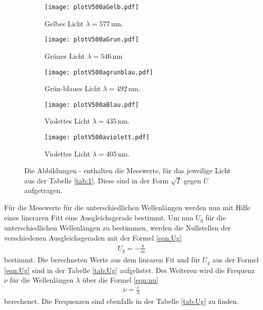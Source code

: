 \begin{figure}
\centering
\begin{subfigure}{0.48\textwidth}
\centering
\texttt{[image: plotV500aGelb.pdf]}
\caption{Gelbes Licht $\lambda=577\,\si{\nano\meter}$.}
\label{fig:ge}
\end{subfigure}
\begin{subfigure}{0.48\textwidth}
\centering
\texttt{[image: plotV500aGrun.pdf]}
\caption{Grünes Licht $\lambda=546\,\si{\nano\meter}$.}
\label{fig:gr}
\end{subfigure}

\begin{subfigure}{0.48\textwidth}
\centering
\texttt{[image: plotV500agrunblau.pdf]}
\caption{Grün-blaues Licht  $\lambda=492\,\si{\nano\meter}$.}
\label{fig:gb}
\end{subfigure}
\begin{subfigure}{0.48\textwidth}
\centering
\texttt{[image: plotV500aBlau.pdf]}
\caption{Violettes Licht $\lambda=435\,\si{\nano\meter}$.}
\label{fig:v1}
\end{subfigure}

\begin{subfigure}{0.48\textwidth}
\centering
\texttt{[image: plotV500aviolett.pdf]}
\caption{Violettes Licht $\lambda=405\,\si{\nano\meter}$.}
\label{fig:v2}
\end{subfigure}

\caption{Die Abbildungen - enthalten die
Messwerte, für das jeweilige Licht aus der Tabelle \ref{tab:1}. Diese sind in der Form
$\sqrt{I}$ gegen $U$ aufgetragen.}
\label{fig:1}
\end{figure}




Für die Messwerte für die unterschiedlichen Wellenlängen werden
nun mit Hilfe eines lineraren Fitt eine Ausgleichsgerade bestimmt.
Um nun $U_g$ für die unterschiedlichen Wellenlängen zu bestimmen,
werden die Nullstellen der verschiedenen Ausgleichsgeraden mit der Formel \eqref{eqn:Ug}
\begin{align}
  U_g=-\frac{b}{m}\label{eqn:Ug}
\end{align}
bestimmt.
Die berechneten Werte aus dem linearen Fit und für $U_g$ aus der Formel
\eqref{eqn:Ug} sind in der Tabelle \ref{tab:Ug} aufgelistet.
Des Weiteren wird die Frequenz $\nu$ für die Wellenlängen $\lambda$ über die Formel \eqref{eqn:nu}
\begin{align}
 \nu=\frac{c}{\lambda}\label{eqn:nu}
\end{align}
berechenet. Die Frequenzen sind ebenfalls in der Tabelle \ref{tab:Ug} zu finden.



